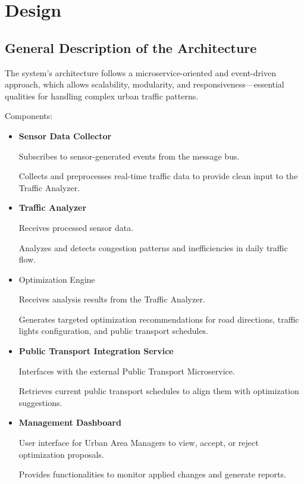 \documentclass[a4paper,12pt]{article}
\begin{document}
\section{Design}

\subsection{General Description of the Architecture}

The system's architecture follows a microservice-oriented and event-driven approach, which allows scalability, modularity, and responsiveness—essential qualities for handling complex urban traffic patterns.

Components:

\begin{itemize}
    \item \textbf{Sensor Data Collector}

Subscribes to sensor-generated events from the message bus.

Collects and preprocesses real-time traffic data to provide clean input to the Traffic Analyzer.

\item \textbf{Traffic Analyzer}

Receives processed sensor data.

Analyzes and detects congestion patterns and inefficiencies in daily traffic flow.

\item Optimization Engine

Receives analysis results from the Traffic Analyzer.

Generates targeted optimization recommendations for road directions, traffic lights configuration, and public transport schedules.

\item \textbf{Public Transport Integration Service}

Interfaces with the external Public Transport Microservice.

Retrieves current public transport schedules to align them with optimization suggestions.

\item \textbf{Management Dashboard}

User interface for Urban Area Managers to view, accept, or reject optimization proposals.

Provides functionalities to monitor applied changes and generate reports.


\end{itemize}
\end{document}
